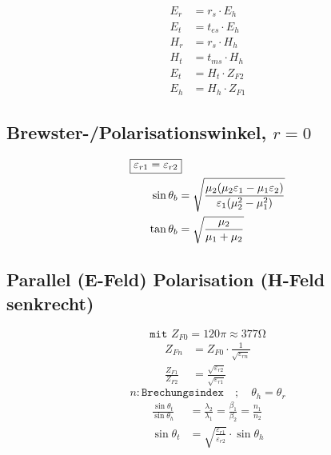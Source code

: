 \begin{align*}
    E_r & = r_s \cdot E_h    \\
    E_t & = t_{es} \cdot E_h \\
    H_r & = r_s \cdot H_h    \\
    H_t & = t_{ms} \cdot H_h \\
    E_t & = H_t\cdot Z_{F2}  \\
    E_h & = H_h\cdot Z_{F1}
\end{align*}

\subsection{Brewster-/Polarisationswinkel, $r=0$}
\begin{align*}
    \Aboxed{\varepsilon_{r1}=\varepsilon_{r2}}                                                                    \\
    \sin\theta_b & = \sqrt{\frac{\mu_2(\mu_2\varepsilon_1 - \mu_1\varepsilon_2)}{\varepsilon_1(\mu_2^2-\mu_1^2)}} \\
    \tan\theta_b & = \sqrt{\frac{\mu_2}{\mu_1+\mu_2}}
\end{align*}

\subsection{Parallel (E-Feld) Polarisation (H-Feld senkrecht)}


\[ \boxed{\texttt{mit } Z_{F0} = 120\pi \approx 377\si{\ohm}} \]
\begin{align*}
    Z_{Fn}                & = Z_{F0}\cdot\frac{1}{\sqrt{\varepsilon_{rn}}}            \\
    \frac{Z_{F1}}{Z_{F2}} & = \frac{\sqrt{\varepsilon_{r2}}}{\sqrt{\varepsilon_{r1}}}
\end{align*}
\[ n: \texttt{Brechungsindex} \quad ; \quad \theta_h = \theta_r\]
\begin{align*}
    \frac{\sin\theta_t}{\sin\theta_h} & = \frac{\lambda_2}{\lambda_1}= \frac{\beta_1}{\beta_2}= \frac{n_1}{n_2} \\
    \sin\theta_t                      & = \sqrt{\frac{\varepsilon_{r1}}{\varepsilon_{r2}}}\cdot\sin\theta_h
\end{align*}

